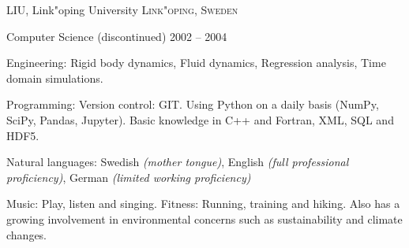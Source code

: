 \documentclass[10pt,a4paper]{article} %
\begin{document}

\headedsection %
{LIU, Link"oping University}
{\textsc{Link"oping, Sweden}} {

\headedsubsection %
{Computer Science \textnormal{(discontinued)}}
{2002 -- 2004} {}
}


\spacedhrule{0.5em}{-0.4em} %



\inlineheadsection %
{Engineering:}
{Rigid body dynamics, Fluid dynamics, Regression analysis, Time domain simulations.}

\inlineheadsection %
{Programming:}
{
Version control: GIT.
Using Python on a daily basis (NumPy, SciPy, Pandas, Jupyter).
Basic knowledge in C++ and Fortran, XML, SQL and HDF5.
}


\inlineheadsection %
{Natural languages:}
{Swedish \textit{(mother tongue)}, English \textit{(full professional proficiency)}, German \textit{(limited working proficiency)}}


\spacedhrule{1.6em}{-0.4em} %


Music: Play, listen and singing. Fitness: Running, training and hiking. Also has a growing involvement in environmental concerns such as sustainability and climate changes. 

\end{document}
